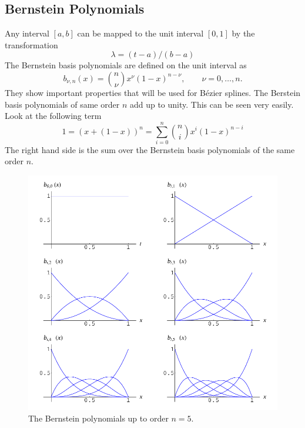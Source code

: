 \subsection{Bernstein Polynomials}
Any interval $[a,b]$ can be mapped to the unit interval $[0,1]$ by the transformation
\[
\lambda=(t-a)/(b-a)
\]
The Bernstein basis polynomials are defined on the unit interval as
\begin{equation}
	 b_{\nu,n}(x) = {n \choose \nu} x^{\nu} (1-x)^{n-\nu}, \qquad \nu=0,\ldots,n. 
	\label{eq:Bernsteinbasis}
\end{equation}
They show important properties that will be used for B\'ezier splines. The
Berstein basis polynomials of same order $n$ add up to unity. This can be seen
very easily. Look at the following term
\[ 1=\left(x+(1-x)\right)^n=\sum_{i=0}^n{n\choose i}x^i(1-x)^{n-i}\]
The right hand side is the sum over the Bernstein basis polynomials of the same
order $n$.
\begin{figure}[!ht]
\begin{center}
\includegraphics[width=\textwidth]{fig/BernsteinPol}
\caption{The Bernstein polynomials up to order $n=5$.\label{fig:BerPol}}
\end{center}
\end{figure}
